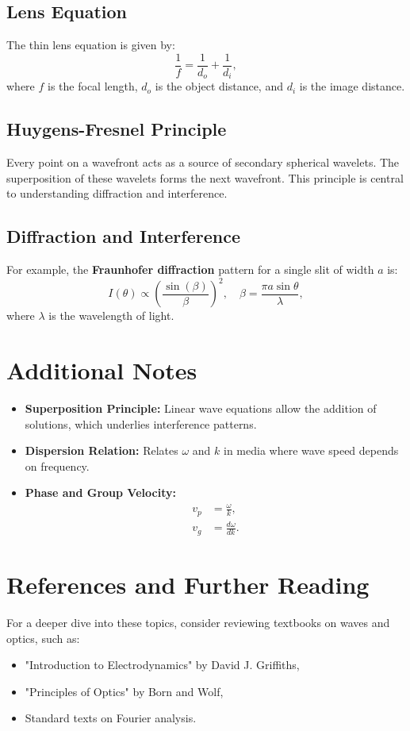 \documentclass[11pt]{article}
\begin{document}
\subsection{Lens Equation}
The thin lens equation is given by:
\begin{equation}
    \frac{1}{f} = \frac{1}{d_o} + \frac{1}{d_i},
\end{equation}
where \(f\) is the focal length, \(d_o\) is the object distance, and \(d_i\) is the image distance.

\subsection{Huygens-Fresnel Principle}
Every point on a wavefront acts as a source of secondary spherical wavelets. The superposition of these wavelets forms the next wavefront. This principle is central to understanding diffraction and interference.

\subsection{Diffraction and Interference}
For example, the \textbf{Fraunhofer diffraction} pattern for a single slit of width \(a\) is:
\begin{equation}
    I(\theta) \propto \left( \frac{\sin(\beta)}{\beta} \right)^2, \quad \beta = \frac{\pi a \sin\theta}{\lambda},
\end{equation}
where \(\lambda\) is the wavelength of light.

\section{Additional Notes}
\begin{itemize}[leftmargin=*, label={--}]
    \item \textbf{Superposition Principle:} Linear wave equations allow the addition of solutions, which underlies interference patterns.
    \item \textbf{Dispersion Relation:} Relates \(\omega\) and \(k\) in media where wave speed depends on frequency.
    \item \textbf{Phase and Group Velocity:}
    \begin{align}
        v_p &= \frac{\omega}{k}, \\
        v_g &= \frac{d\omega}{dk}.
    \end{align}
\end{itemize}

\section{References and Further Reading}
For a deeper dive into these topics, consider reviewing textbooks on waves and optics, such as:
\begin{itemize}[leftmargin=*, label={--}]
    \item "Introduction to Electrodynamics" by David J. Griffiths,
    \item "Principles of Optics" by Born and Wolf,
    \item Standard texts on Fourier analysis.
\end{itemize}
\end{document}
